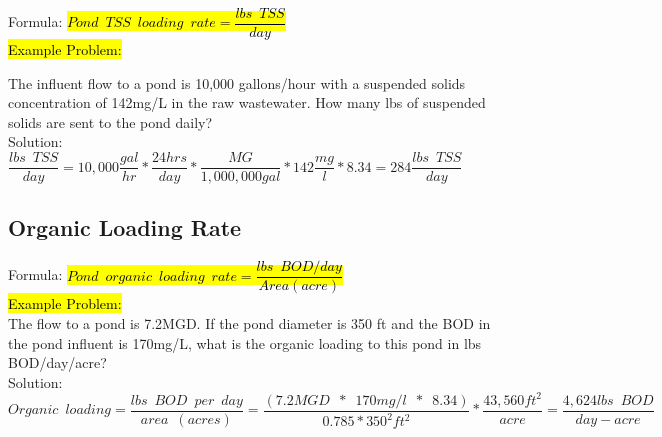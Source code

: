 Formula: \hl{$Pond \enspace TSS \enspace loading \enspace rate =  \dfrac{lbs \enspace TSS}{day}$}  \\
\vspace{0.3cm}
\hl{Example Problem:}\\
\vspace{0.3cm}

The influent flow to a pond is 10,000 gallons/hour with a suspended solids concentration of 142mg/L in the raw wastewater.  How many lbs of suspended solids are sent to the pond daily?
\\
Solution:\\
\vspace{0.3cm}
$\dfrac{lbs \enspace TSS}{day}=10,000\dfrac{gal}{hr}*\dfrac{24hrs}{day}*\dfrac{MG}{1,000,000gal}*142\dfrac{mg}{l}*8.34=\boxed{284\dfrac{lbs \enspace TSS}{day}}$

\vspace{0.3cm}

\subsection{Organic Loading Rate}

\vspace{0.3cm}
Formula: \hl{$Pond \enspace organic \enspace loading \enspace rate =  \dfrac{lbs \enspace BOD/day}{Area (acre)}$}  \\
\vspace{0.3cm}
\hl{Example Problem:}\\
\vspace{0.3cm}
The flow to a pond is 7.2MGD. If the pond diameter is 350 ft and the BOD in the pond influent is 170mg/L, what is the organic loading to this pond in lbs BOD/day/acre?
\\
Solution:\\
\vspace{0.3cm}
$Organic \enspace loading=\dfrac{lbs \enspace BOD \enspace per \enspace day}{area \enspace (acres)}=\dfrac{(7.2MGD \enspace * \enspace 170mg/l \enspace * \enspace 8.34)}{0.785*350^2ft^2}*\dfrac{43,560ft^2}{acre}=\boxed{\dfrac{4,624lbs \enspace BOD}{day-acre}}$

\vspace{0.3cm}

